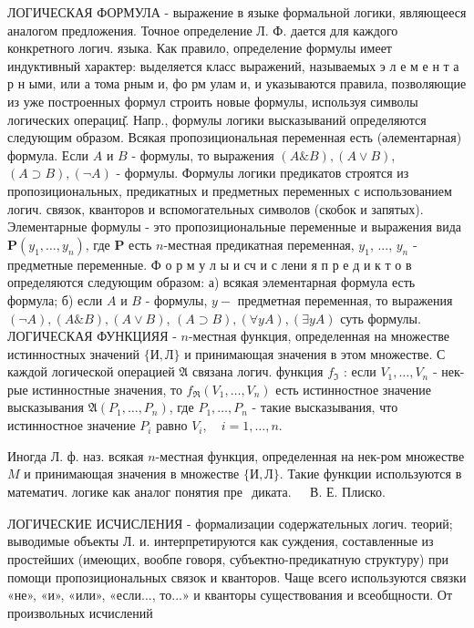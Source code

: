 \documentclass[10pt]{article}
\begin{document}
ЛОГИЧЕСКАЯ ФОРМУЛА - выражение в языке формальной логики, являющееся аналогом предложения. Точное определение Л. Ф. дается для каждого конкретного логич. языка. Как правило, определение формулы имеет индуктивный характер: выделяется класс выражений, называемых э л е м е н т а р н ыми, или а тома рным и, фо рм улам и, и указываются правила, позволяющие из уже построенных формул строить новые формулы, используя символы логических операциц̆. Напр., формулы логики высказываний определяются следующим образом. Всякая пропозициональная переменная есть (әлементарная) формула. Если $A$ и $B$ - формулы, то выражения $(A \& B),(A \vee B)$, $(A \supset B),(\neg A)$ - формулы. Формулы логики предикатов строятся из пропозициональных, предикатных и предметных переменных с использованием логич. связок, кванторов и вспомогательных символов (скобок и запятых). Элементарные формулы - это пропозициональные переменные и выражения вида $\boldsymbol{P}\left(y_{1}, \ldots, y_{n}\right)$, где $\boldsymbol{P}$ есть $n$-местная предикатная переменная, $y_{1}$, ..., $y_{n}$ - предметные переменные. Ф о р м у л ы и сч и с лени я п р е д и к т о в определяются следующим образом: а) всякая элементарная формула есть формула; б) если $A$ и $B$ - формулы, $y-$ предметная переменная, то выражения $(\neg A),(A \& B),(A \vee B)$, $(A \supset B),(\forall y A),(\exists y A)$ суть формулы. ЛОГИЧЕСКАЯ ФУНКЦИЯЯ - $n$-местная функция, определенная на множестве истинностных значений $\{И, Л\}$ и принимающая значения в этом множестве. С каждой логической операцией $\mathfrak{A}$ связана логич. функция $f_{\Im}$ : если $V_{1}, \ldots, V_{n}$ - нек-рые истинностные значения, то $f_{\Re}\left(V_{1}, \ldots, V_{n}\right)$ есть истинностное значение высказывания $\mathfrak{A}\left(P_{1}, \ldots, P_{n}\right)$, где $P_{1}, \ldots, P_{n}$ - такие высказывания, что истинностное значение $P_{i}$ равно $V_{i}, \quad i=1, \ldots, n$.



Иногда Л. ф. наз. всякая $n$-местная функция, определенная на нек-ром множестве $M$ и принимающая значения в множестве $\{И, Л\}$. Такие функции используются в математич. логике как аналог понятия пре$\begin{array}{ll}\text { диката. } & \text { В. Е. Плиско. }\end{array}$



ЛОГИЧЕСКИЕ ИСЧИСЛЕНИЯ - формализации содержательных логич. теорий; выводимые объекты Л. и. интерпретируются как суждения, составленные из простейших (имеющих, вообпе говоря, субъектно-предикатную структуру) при помощи пропозициональных связок и кванторов. Чаще всего используются связки «не», «и», «или», «если..., то...» и кванторы существования и всеобщности. От произвольных исчислений
\end{document}
